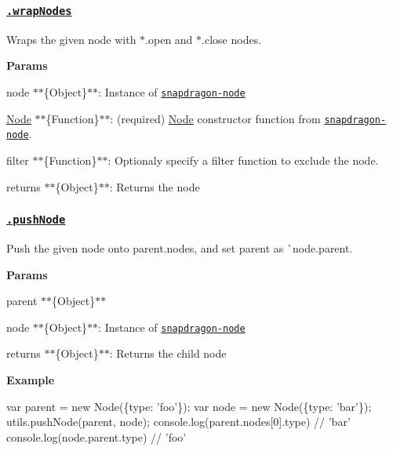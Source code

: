 \subsubsection*{\href{index.js#L274}{\tt .wrap\+Nodes}}

Wraps the given {\ttfamily node} with {\ttfamily $\ast$.open} and {\ttfamily $\ast$.close} nodes.

{\bfseries Params}


\begin{DoxyItemize}
\item {\ttfamily node} $\ast$$\ast$\{Object\}$\ast$$\ast$\+: Instance of \href{https://github.com/jonschlinkert/snapdragon-node}{\tt snapdragon-\/node}
\item {\ttfamily \mbox{\hyperlink{classNode}{Node}}} $\ast$$\ast$\{Function\}$\ast$$\ast$\+: (required) \mbox{\hyperlink{classNode}{Node}} constructor function from \href{https://github.com/jonschlinkert/snapdragon-node}{\tt snapdragon-\/node}.
\item {\ttfamily filter} $\ast$$\ast$\{Function\}$\ast$$\ast$\+: Optionaly specify a filter function to exclude the node.
\item {\ttfamily returns} $\ast$$\ast$\{Object\}$\ast$$\ast$\+: Returns the node
\end{DoxyItemize}

\subsubsection*{\href{index.js#L299}{\tt .push\+Node}}

Push the given {\ttfamily node} onto {\ttfamily parent.\+nodes}, and set {\ttfamily parent} as \`{}node.parent.

{\bfseries Params}


\begin{DoxyItemize}
\item {\ttfamily parent} $\ast$$\ast$\{Object\}$\ast$$\ast$
\item {\ttfamily node} $\ast$$\ast$\{Object\}$\ast$$\ast$\+: Instance of \href{https://github.com/jonschlinkert/snapdragon-node}{\tt snapdragon-\/node}
\item {\ttfamily returns} $\ast$$\ast$\{Object\}$\ast$$\ast$\+: Returns the child node
\end{DoxyItemize}

{\bfseries Example}


\begin{DoxyCode}
var parent = new Node(\{type: 'foo'\});
var node = new Node(\{type: 'bar'\});
utils.pushNode(parent, node);
console.log(parent.nodes[0].type) // 'bar'
console.log(node.parent.type) // 'foo'
\end{DoxyCode}


